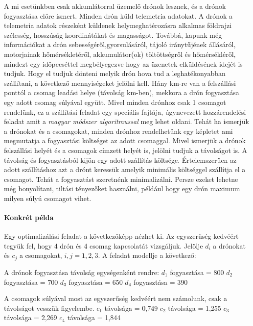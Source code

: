 A mi esetünkben csak akkumlátorral üzemelő drónok lesznek, és a drónok fogyasztása előre ismert.
Minden drón küld telemetria adatokat.
A drónok a telemetria adatok részeként küldenek helymeghatérozásra alkalmas földrajzi szélesség, hosszúság koordinátákat és magasságot.
Továbbá, kapunk még információkat a drón sebességéről,gyorsulásáról, tájoló iránytűjének állásáról, motorjainak hőmérsékletéről,
akkumulátor(ok) töltöttségről és hőmérsékléről, mindezt egy időpecséttel megbélyegezve hogy az üzenetek elküldésének idejét is tudjuk.
Hogy el tudjuk dönteni melyik drón hova tud a leghatékonyabban szállítani, a következő mennyiségeket jelölni kell. Hány km-re van a felszállási ponttól a csomag leadási helye (távolság km-ben), mekkora a drón fogyasztása egy adott csomag súlyával együtt.
Mivel minden drónhoz csak 1 csomagot rendelünk, ez a szállítási feladat egy speciális fajtája, úgynevezett hozzárendelési feladat amit a \textit{magyar módszer algoritmussal}\cite{magyar-modszer} meg lehet oldani.
Tehát ha ismerjük a drónokat és a csomagokat, minden drónhoz rendelhetünk egy képletet ami megmutatja a fogyasztási költséget az adott csomaggal. Mivel ismerjük a drónok felszállási helyét és a csomagok címzett helyét is, jelölni tudjuk a távolságot is.
A távolság és fogyasztásból kijön egy adott szállítás költsége. Értelemszerűen az adott szállításhoz azt a drónt keressük amelyik minimális költséggel szállítja el a csomagot. Tehát a fogyasztást szeretnénk minimalizálni.
Persze ezeket lehetne még bonyolítani, tiltási tényezőket használni, például hogy egy drón maximum milyen súlyú csomagot vihet.

\paragraph{Konkrét példa}
Egy optimalizálási feladat a következőképp nézhet ki. Az egyszerűség kedvéért tegyük fel, hogy 4 drón és 4 csomag kapcsolatát vizsgáljuk. Jelölje $d_{i}$ a drónokat és $c_{j}$ a csomagokat, $i, j = 1, 2, 3.$
A feladat modellje a következő:

A drónok fogyasztása távolság egységenként rendre:
$d_{1}$ fogyasztása = 800
$d_{2}$ fogyasztása = 700
$d_{3}$ fogyasztása = 650
$d_{4}$ fogyasztása = 390

A csomagok súlyával most az egyszerűség kedvéért nem számolunk, csak a távolságot vesszük figyelembe.
$c_{1}$ távolsága = 0,749
$c_{2}$ távolsága = 1,255
$c_{3}$ távolsága = 2,269
$c_{4}$ távolsága = 1,844 \\

